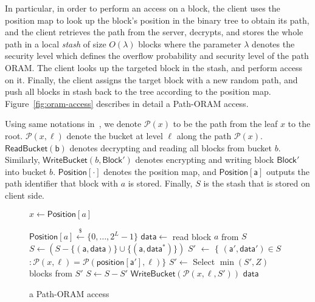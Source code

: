 In particular, in order to perform an access on a block, the client uses the position map to look up the block's position in the binary tree to obtain its path, and the client retrieves the path from the server, decrypts, and stores the whole path in a local \textit{stash} of size $O(\lambda)$ blocks where the parameter $\lambda$ denotes the security level which defines the overflow probability and security level of the path ORAM. 
The client looks up the targeted block in the stash, and perform access on it. 
Finally, the client assigns the target block with a new random path, and push all blocks in stash back to the tree according to the position map. 
Figure~\ref{fig:oram-access} describes in detail a Path-ORAM access. 

Using same notations in~\cite{Stefanov:2013}, we denote $\mathcal P(x)$ to be the path from the leaf $x$ to the root. $\mathcal P(x,\ell)$ denote the bucket at level $\ell$ along the path $\mathcal P(x)$. $\mathsf{ReadBucket(b)}$ denotes decrypting and reading all blocks from bucket $b$. Similarly, $\mathsf{WriteBucket}(b,\mathsf{Block}')$ denotes encrypting and writing block $\mathsf{Block}'$ into bucket $b$. $\mathsf{Position}[\cdot]$ denotes the position map, and $\mathsf{Position[a]}$ outputs the path identifier that block with $a$ is stored. Finally, $S$ is the stash that is stored on client side.
\\
{
\begin{figure}[!h]\label{fig:oram-access}
	\centering
	\begin{minipage}{\linewidth}
	\begin{algorithm}[H]
	  	\caption{$\mathsf{Path\text{-}ORAM.Access(op,a,data^*})$\label{alg}}
	  	\begin{algorithmic}[1]
			\State $x \leftarrow \mathsf{Position}[a]$
			\item $\mathsf{Position}[a] \stackrel{\$}{\leftarrow} \{0,\dots,2^L-1\}$ 
			\EndFor
			\State $\mathsf{data}\leftarrow$ read block $a$ from $S$
			\State $S \leftarrow (S - \mathsf{\{(a,data)\}\cup \{(a,data^*)\}})$
			\EndIf
			\State $S'$ $\leftarrow$ $\{$ $\mathsf{(a',data')}$$\in$$ S$$:\mathcal{P}(x,\ell)=\mathcal{P}(\mathsf{position[a'],\ell})$$\}$
			\State $S' \leftarrow$ Select $\min(S',Z)$ blocks from $S'$
 			\State $S \leftarrow S - S'$
			\State $\mathsf{WriteBucket}(\mathcal{P}(x,\ell,S'))$
			\EndFor
			\State \Return $\mathsf{data}$
		\end{algorithmic}	
	\end{algorithm}
	\end{minipage}
	\caption{a Path-ORAM access}
\end{figure}
}
